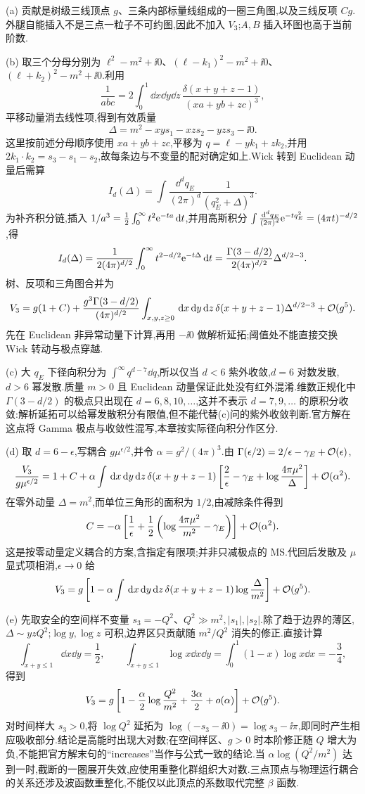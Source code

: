 \begin{solution}
(a) 贡献是树级三线顶点 $g$、三条内部标量线组成的一圈三角图,以及三线反项 $Cg$.外腿自能插入不是三点一粒子不可约图,因此不加入 $V_3$;$A,B$ 插入环图也高于当前阶数.

(b) 取三个分母分别为 $\ell^2-m^2+\ii0$、$(\ell-k_1)^2-m^2+\ii0$、$(\ell+k_2)^2-m^2+\ii0$.利用
\[
\frac1{abc}=2\int_0^1\dd x\dd y\dd z\,
\frac{\delta(x+y+z-1)}{(xa+yb+zc)^3},
\]
平移动量消去线性项,得到有效质量
\[
\Delta=m^2-xy s_1-xz s_2-yz s_3-\ii0.
\]
这里按前述分母顺序使用 $xa+yb+zc$,平移为 $q=\ell-yk_1+zk_2$,并用 $2k_1\cdot k_2=s_3-s_1-s_2$,故每条边与不变量的配对确定如上.Wick 转到 Euclidean 动量后需算
\[
I_d(\Delta)=\int\frac{\dd^dq_E}{(2\pi)^d}\frac1{(q_E^2+\Delta)^3}.
\]
为补齐积分链,插入 $1/a^3=\frac12\int_0^\infty t^2\mathrm e^{-ta}\,\mathrm d t$,并用高斯积分 $\int\frac{\,\mathrm d^dq_E}{(2\pi)^d}\mathrm e^{-tq_E^2}=(4\pi t)^{-d/2}$,得
\[
I_d(\Delta)=\frac1{2(4\pi)^{d/2}}
\int_0^\infty t^{2-d/2}\mathrm e^{-t\Delta}\,\mathrm d t
=\frac{\Gamma(3-d/2)}{2(4\pi)^{d/2}}\Delta^{d/2-3}.
\]
树、反项和三角图合并为
\[
V_3=g(1+C)+\frac{g^3\Gamma(3-d/2)}{(4\pi)^{d/2}}
\int_{x,y,z\ge0}\,\mathrm d x\,\mathrm d y\,\mathrm d z\,
\delta(x+y+z-1)\Delta^{d/2-3}+\mathcal O(g^5).
\]
先在 Euclidean 非异常动量下计算,再用 $-\ii0$ 做解析延拓;阈值处不能直接交换 Wick 转动与极点穿越.

(c) 大 $q_E$ 下径向积分为 $\int^\infty q^{d-7}\dd q$,所以仅当 $d<6$ 紫外收敛,$d=6$ 对数发散,$d>6$ 幂发散.质量 $m>0$ 且 Euclidean 动量保证此处没有红外混淆.维数正规化中 $\Gamma(3-d/2)$ 的极点只出现在 $d=6,8,10,\ldots$,这并不表示 $d=7,9,\ldots$ 的原积分收敛:解析延拓可以给幂发散积分有限值,但不能代替(c)问的紫外收敛判断.官方解在这点将 Gamma 极点与收敛性混写,本章按实际径向积分作区分.

(d) 取 $d=6-\epsilon$,写耦合 $g\mu^{\epsilon/2}$,并令 $\alpha=g^2/(4\pi)^3$.由 $\Gamma(\epsilon/2)=2/\epsilon-\gamma_E+\mathcal O(\epsilon)$,
\[
\frac{V_3}{g\mu^{\epsilon/2}}
=1+C+\alpha\int\,\mathrm d x\,\mathrm d y\,\mathrm d z\,\delta(x+y+z-1)
\left[\frac2\epsilon-\gamma_E+\log\frac{4\pi\mu^2}{\Delta}\right]+\mathcal O(\alpha^2).
\]
在零外动量 $\Delta=m^2$,而单位三角形的面积为 $1/2$,由减除条件得到
\[
C=-\alpha\left[\frac1\epsilon+
\frac12\left(\log\frac{4\pi\mu^2}{m^2}-\gamma_E\right)\right]+\mathcal O(\alpha^2).
\]
这是按零动量定义耦合的方案,含指定有限项;并非只减极点的 MS.代回后发散及 $\mu$ 显式项相消,$\epsilon\to0$ 给
\[
V_3=g\left[1-\alpha\int\,\mathrm d x\,\mathrm d y\,\mathrm d z\,
\delta(x+y+z-1)\log\frac{\Delta}{m^2}\right]+\mathcal O(g^5).
\]

(e) 先取安全的空间样不变量 $s_3=-Q^2$、$Q^2\gg m^2,|s_1|,|s_2|$.除了趋于边界的薄区,$\Delta\sim yzQ^2$;$\log y,\log z$ 可积,边界区只贡献随 $m^2/Q^2$ 消失的修正.直接计算
\[
\int_{x+y\le1}\dd x\dd y=\frac12,
\qquad
\int_{x+y\le1}\log x\dd x\dd y
=\int_0^1(1-x)\log x\dd x=-\frac34,
\]
得到
\[
V_3=g\left[1-\frac\alpha2\log\frac{Q^2}{m^2}
+\frac{3\alpha}{2}+o(\alpha)\right]+\mathcal O(g^5).
\]
对时间样大 $s_3>0$,将 $\log Q^2$ 延拓为 $\log(-s_3-\ii0)=\log s_3-\ii\pi$,即同时产生相应吸收部分.结论是高能时出现大对数;在空间样区、$g>0$ 时本阶修正随 $Q$ 增大为负,不能把官方解末句的“increases”当作与公式一致的结论.当 $\alpha\log(Q^2/m^2)$ 达到一时,截断的一圈展开失效,应使用重整化群组织大对数.三点顶点与物理运行耦合的关系还涉及波函数重整化,不能仅以此顶点的系数取代完整 $\beta$ 函数.
\end{solution}
